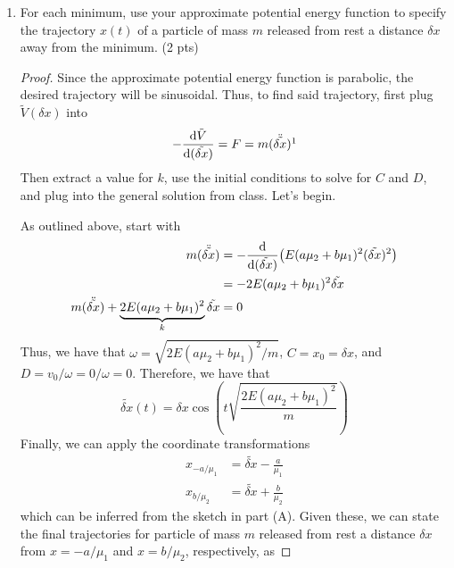 \documentclass[../psets.tex]{subfiles}
\begin{document}
\begin{enumerate}
\begin{enumerate}
\begin{proof}
        \end{proof}
        \item For each minimum, use your approximate potential energy function to specify the trajectory $x(t)$ of a particle of mass $m$ released from rest a distance $\delta x$ away from the minimum. (2 pts)
        \begin{proof}
            Since the approximate potential energy function is parabolic, the desired trajectory will be sinusoidal. Thus, to find said trajectory, first plug $\tilde{V}(\delta x)$ into
            \begin{equation*}
                -\dv{\tilde{V}}{(\tilde{\delta x})} = F = m(\ddot{\tilde{\delta x}})\footnotemark
            \end{equation*}
            Then extract a value for $k$, use the initial conditions to solve for $C$ and $D$, and plug into the general solution from class. Let's begin.\par
            As outlined above, start with
            \begin{align*}
                m(\ddot{\tilde{\delta x}}) &= -\dv{(\tilde{\delta x})}(E(a\mu_2+b\mu_1)^2(\tilde{\delta x})^2)\\
                &= -2E(a\mu_2+b\mu_1)^2\tilde{\delta x}\\
                m(\ddot{\tilde{\delta x}})+\underbrace{2E(a\mu_2+b\mu_1)^2}_k\tilde{\delta x} &= 0
            \end{align*}
            Thus, we have that $\omega=\sqrt{2E(a\mu_2+b\mu_1)^2/m}$, $C=x_0=\delta x$, and $D=v_0/\omega=0/\omega=0$. Therefore, we have that
            \begin{equation*}
                \tilde{\delta x}(t) = \delta x\cos(t\sqrt{\frac{2E(a\mu_2+b\mu_1)^2}{m}})
            \end{equation*}
            Finally, we can apply the coordinate transformations
            \begin{align*}
                x_{-a/\mu_1} &= \tilde{\delta x}-\frac{a}{\mu_1}\\
                x_{b/\mu_2} &= \tilde{\delta x}+\frac{b}{\mu_2}
            \end{align*}
            which can be inferred from the sketch in part (A). Given these, we can state the final trajectories for particle of mass $m$ released from rest a distance $\delta x$ from $x=-a/\mu_1$ and $x=b/\mu_2$, respectively, as

\end{proof}
\end{enumerate}
\end{enumerate}
\end{document}
